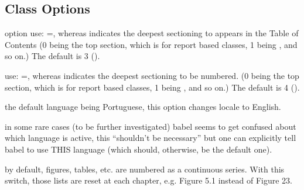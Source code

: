 \documentclass[article,nofontwarning,nogeometry,english,tocdepth=3,secdepth=3]{ufrgscca} %
\begin{document}
\subsection{Class Options}
\begin{describelist}{option}
	 { use: =, whereas  indicates the deepest sectioning to appears in the Table of Contents (0 being the top section, which is \tsmacro{\chapter}{} for report based classes, 1 being \tsmacro{\section}{}, and so on.) The default  is 3 (\tsmacro{\subsubsection}{}).}

	 { use: =, whereas  indicates the deepest sectioning to be numbered. (0 being the top section, which is \tsmacro{\chapter}{} for report based classes, 1 being \tsmacro{\section}{}, and so on.) The default is 4 (\tsmacro{\paragraph}{}).}

	 { the default language being Portuguese, this option changes locale to English.}

	 { in some rare cases (to be further investigated) babel seems to get confused about which language is active, this “shouldn't be necessary” but one can explicitly tell babel to use THIS language (which should, otherwise, be the default one).}

	 { by default, figures, tables, etc. are numbered as a continuous series. With this switch, those lists are reset at each chapter, e.g. Figure 5.1 instead of Figure 23.}


\end{describelist}
\end{document}
